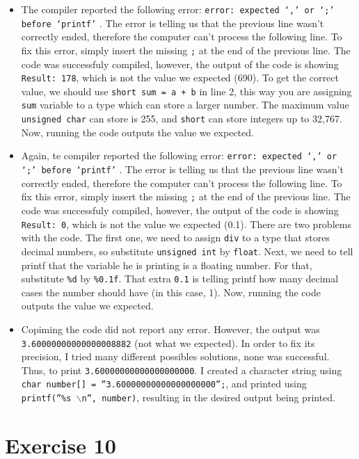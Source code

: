 \documentclass{article}
\begin{document}
\begin{itemize}
    \item{The compiler reported the following error: \texttt{error: expected ‘,’ or ‘;’ before ‘printf’} . The error is telling us that the previous line wasn't correctly ended, therefore the computer can't process the following line. To fix this error, simply insert the missing \texttt{;} at the end of the previous line. The code was successfuly compiled, however, the output of the code is showing \texttt{Result: 178}, which is not the value we expected (690). To get the correct value, we should use \texttt{short sum = a + b} in line 2, this way you are assigning \texttt{sum} variable to a type which can store a larger number. The maximum value \texttt{unsigned char} can store is 255, and \texttt{short} can store integers up to 32,767. Now, running the code outputs the value we expected.}
    \item{Again, te compiler reported the following error: \texttt{error: expected ‘,’ or ‘;’ before ‘printf’} . The error is telling us that the previous line wasn't correctly ended, therefore the computer can't process the following line. To fix this error, simply insert the missing \texttt{;} at the end of the previous line. The code was successfuly compiled, however, the output of the code is showing \texttt{Result: 0}, which is not the value we expected (0.1). There are two problems with the code. The first one, we need to assign \texttt{div} to a type that stores decimal numbers, so substitute \texttt{unsigned int} by \texttt{float}. Next, we need to tell printf that the variable he is printing is a floating number. For that, substitute \texttt{\%d} by \texttt{\%0.1f}. That extra \texttt{0.1} is telling printf how many decimal cases the number should have (in this case, 1). Now, running the code outputs the value we expected.}
    \item{Copiming the code did not report any error. However, the output was \texttt{3.60000000000000008882} (not what we expected). In order to fix its precision, I tried many different possibles solutions, none was successful. Thus, to print \texttt{3.60000000000000000000}. I created a character string using \texttt{char number[] = ''3.60000000000000000000'';}, and printed using \texttt{printf(''\%s $\backslash$n'', number)}, resulting in the desired output being printed.}
\end{itemize}


\newpage

\section{Exercise 10}
\end{document}
